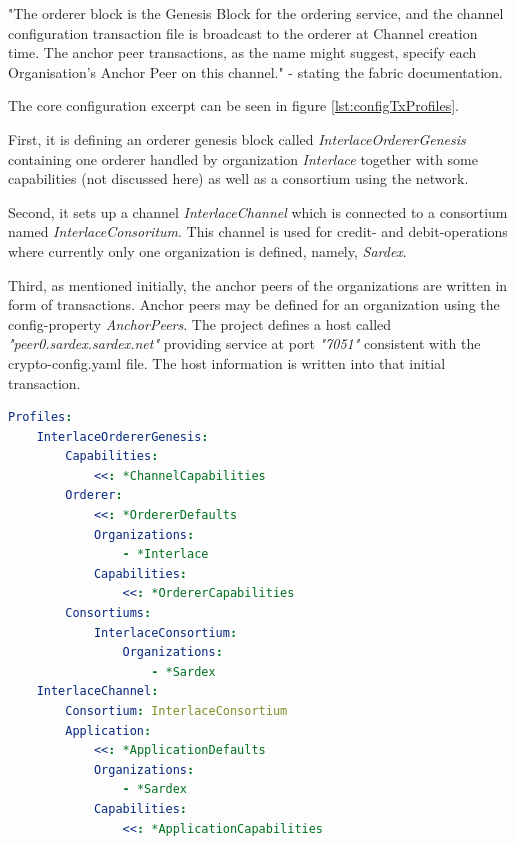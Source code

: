 "The orderer block is the Genesis Block for the ordering service, and the channel configuration transaction file is
broadcast to the orderer at Channel creation time. The anchor peer transactions, as the name might suggest, specify
each Organisation's Anchor Peer on this channel." - stating the fabric documentation.

The core configuration excerpt can be seen in figure \ref{lst:configTxProfiles}.

First, it is defining an orderer genesis block called \textit{InterlaceOrdererGenesis} containing one orderer handled by organization \textit{Interlace} together with some capabilities (not discussed here) as well as a consortium using the network.

Second, it sets up a channel \textit{InterlaceChannel} which is connected to a consortium named \textit{InterlaceConsoritum}. This channel is used for credit- and debit-operations where currently only one organization is defined, namely, \textit{Sardex}.

Third, as mentioned initially, the anchor peers of the organizations are written in form of transactions. Anchor peers may be defined for an organization using the config-property \textit{AnchorPeers}. The project defines a host called \textit{"peer0.sardex.sardex.net"} providing service at port \textit{"7051"} consistent with the crypto-config.yaml file. The host information is written into that initial transaction.

\begin{center}
\begin{minipage}{0.8\textwidth}
\small
\begin{lstlisting}[language=yaml,firstnumber=1,caption={\bf\small configtx.yaml excerpt - Profiles definition}, captionpos=b,label=lst:configTxProfiles]
Profiles:
    InterlaceOrdererGenesis:
        Capabilities:
            <<: *ChannelCapabilities
        Orderer:
            <<: *OrdererDefaults
            Organizations:
                - *Interlace
            Capabilities:
                <<: *OrdererCapabilities
        Consortiums:
            InterlaceConsortium:
                Organizations:
                    - *Sardex
    InterlaceChannel:
        Consortium: InterlaceConsortium
        Application:
            <<: *ApplicationDefaults
            Organizations:
                - *Sardex
            Capabilities:
                <<: *ApplicationCapabilities
\end{lstlisting}
\end{minipage}
\end{center}

